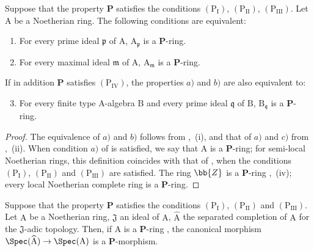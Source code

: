 \begin{corollary}[7.4.5]
\label{IV.7.4.5}
Suppose that the property $\boldsymbol{P}$ satisfies the conditions $(\mathrm{P_I})$, $(\mathrm{P_{II}})$, $(\mathrm{P_{III}})$.
Let $\mathrm{A}$ be a Noetherian ring.
The following conditions are equivalent:
\begin{enumerate}[label=\emph{\alph*)}]
  \item For every prime ideal $\mathfrak{p}$ of $\mathrm{A}$, $\mathrm{A}_\mathfrak{p}$ is a $\boldsymbol{P}$-ring.
  \item For every maximal ideal $\mathfrak{m}$ of $\mathrm{A}$, $\mathrm{A}_\mathfrak{m}$ is a $\boldsymbol{P}$-ring.
\end{enumerate}
If in addition $\boldsymbol{P}$ satisfies $(\mathrm{P_{IV}})$, the properties $a)$ and $b)$ are also equivalent to:
\begin{enumerate}[label=\emph{\alph*)}]
  \setcounter{enumi}{2}
  \item For every finite type A-algebra $\mathrm{B}$ and every prime ideal $\mathfrak{q}$ of $\mathrm{B}$, $\mathrm{B}_\mathfrak{q}$ is a $\boldsymbol{P}$-ring.
\end{enumerate}
\end{corollary}

\begin{proof}
The equivalence of $a)$ and $b)$ follows from ,~(i), and that of $a)$ and $c)$ from ,~(ii).
When condition $a)$ of  is satisfied, we say that $\mathrm{A}$ is a $\boldsymbol{P}$-ring; for semi-local Noetherian rings, this definition coincides with that of , when the conditions $(\mathrm{P_I})$, $(\mathrm{P_{II}})$ and $(\mathrm{P_{III}})$ are satisfied.
The ring $\bb{Z}$ is a $\boldsymbol{P}$-ring ,~(iv); every local Noetherian complete ring is a $\boldsymbol{P}$-ring.
\end{proof}

\begin{proposition}[7.4.6]
\label{IV.7.4.6}
Suppose that the property $\boldsymbol{P}$ satisfies the conditions $(\mathrm{P_I})$, $(\mathrm{P_{II}})$ and $(\mathrm{P_{III}})$.
Let $\mathrm{A}$ be a Noetherian ring, $\mathfrak{J}$ an ideal of $\mathrm{A}$, $\widehat{\mathrm{A}}$ the separated completion of $\mathrm{A}$ for the $\mathfrak{J}$-adic topology.
Then, if $\mathrm{A}$ is a $\boldsymbol{P}$-ring , the canonical morphism $\Spec(\widehat{\mathrm{A}})\to\Spec(\mathrm{A})$ is a $\boldsymbol{P}$-morphism.
\end{proposition}

